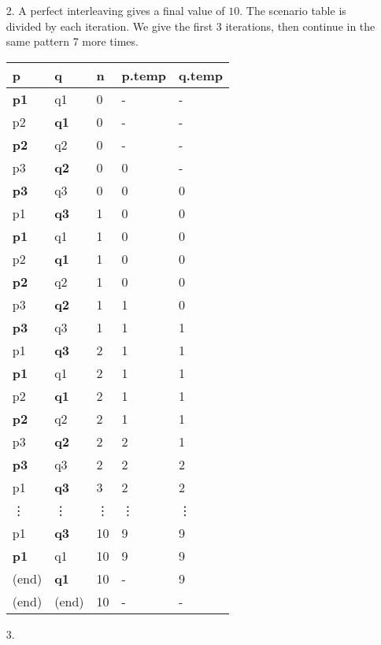 \documentclass[11pt]{exam}
\begin{document}
\begin{enumerate}
  \item[2.] A perfect interleaving gives a final value of $10$. The scenario table is divided by each iteration. We give the first 3 iterations, then continue in the same pattern 7 more times. 
    \begin{center}
    \begin{tabular}{|p{2cm}|p{2cm}|p{2cm}|p{2cm}|p{2cm}|}
      \hline
      \textbf{p} & \textbf{q} & \textbf{n} & \textbf{p.temp} & \textbf{q.temp}\\
      \hline
      \textbf{p1} & q1 & 0 & - & -\\
      p2 & \textbf{q1} & 0 & - & -\\
      \textbf{p2} & q2 & 0 & - & - \\
      p3 & \textbf{q2} & 0 & 0 & - \\
      \textbf{p3} & q3 & 0 & 0 & 0 \\
      p1 & \textbf{q3} & 1 & 0 & 0 \\ 
      \hline
      \textbf{p1} & q1 & 1 & 0 & 0\\
      p2 & \textbf{q1} & 1 & 0 & 0\\
      \textbf{p2} & q2 & 1 & 0 & 0 \\
      p3 & \textbf{q2} & 1 & 1 & 0 \\
      \textbf{p3} & q3 & 1 & 1 & 1 \\
      p1 & \textbf{q3} & 2 & 1 & 1 \\
      \hline
      \textbf{p1} & q1 & 2 & 1 & 1\\
      p2 & \textbf{q1} & 2 & 1 & 1\\
      \textbf{p2} & q2 & 2 & 1 & 1 \\
      p3 & \textbf{q2} & 2 & 2 & 1 \\
      \textbf{p3} & q3 & 2 & 2 & 2 \\
      p1 & \textbf{q3} & 3 & 2 & 2 \\
      \vdots & \vdots & \vdots & \vdots & \vdots\\
      p1 & \textbf{q3} & 10 & 9 & 9 \\
      \textbf{p1} & q1 & 10 & 9 & 9 \\
      (end) & \textbf{q1} & 10 & - & 9\\
      (end) & (end) & 10 & - & -\\
      \hline
          \end{tabular}
  \end{center}
\item[3.]

\end{enumerate}
\end{document}
